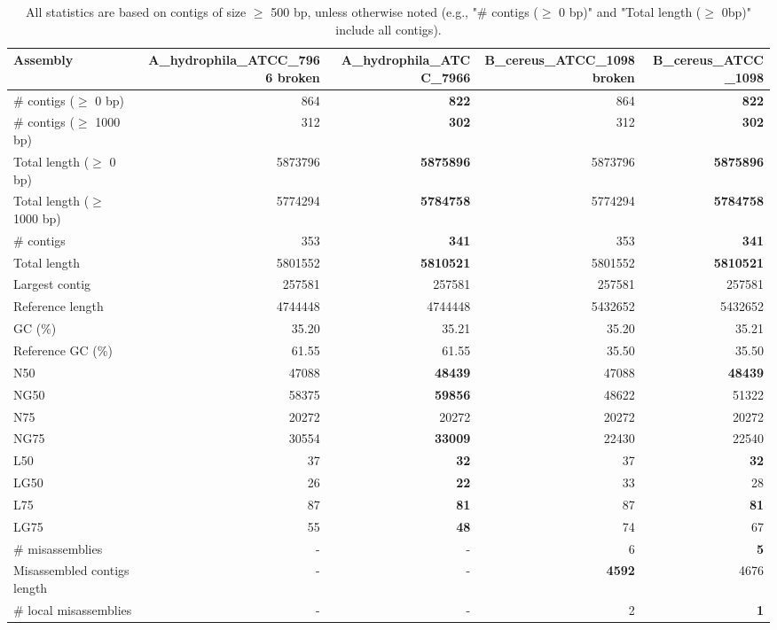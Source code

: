 \documentclass[12pt,a4paper]{article}
\begin{document}
\begin{table}[ht]
\begin{center}
\caption{All statistics are based on contigs of size $\geq$ 500 bp, unless otherwise noted (e.g., "\# contigs ($\geq$ 0 bp)" and "Total length ($\geq$ 0bp)" include all contigs).}
\begin{tabular}{|l*{4}{|r}|}
\hline
Assembly & A\_hydrophila\_ATCC\_7966 broken & A\_hydrophila\_ATCC\_7966 & B\_cereus\_ATCC\_1098 broken & B\_cereus\_ATCC\_1098 \\ \hline
\# contigs ($\geq$ 0 bp) & 864 & {\bf 822} & 864 & {\bf 822} \\ \hline
\# contigs ($\geq$ 1000 bp) & 312 & {\bf 302} & 312 & {\bf 302} \\ \hline
Total length ($\geq$ 0 bp) & 5873796 & {\bf 5875896} & 5873796 & {\bf 5875896} \\ \hline
Total length ($\geq$ 1000 bp) & 5774294 & {\bf 5784758} & 5774294 & {\bf 5784758} \\ \hline
\# contigs & 353 & {\bf 341} & 353 & {\bf 341} \\ \hline
Total length & 5801552 & {\bf 5810521} & 5801552 & {\bf 5810521} \\ \hline
Largest contig & 257581 & 257581 & 257581 & 257581 \\ \hline
Reference length & 4744448 & 4744448 & 5432652 & 5432652 \\ \hline
GC (\%) & 35.20 & 35.21 & 35.20 & 35.21 \\ \hline
Reference GC (\%) & 61.55 & 61.55 & 35.50 & 35.50 \\ \hline
N50 & 47088 & {\bf 48439} & 47088 & {\bf 48439} \\ \hline
NG50 & 58375 & {\bf 59856} & 48622 & 51322 \\ \hline
N75 & 20272 & 20272 & 20272 & 20272 \\ \hline
NG75 & 30554 & {\bf 33009} & 22430 & 22540 \\ \hline
L50 & 37 & {\bf 32} & 37 & {\bf 32} \\ \hline
LG50 & 26 & {\bf 22} & 33 & 28 \\ \hline
L75 & 87 & {\bf 81} & 87 & {\bf 81} \\ \hline
LG75 & 55 & {\bf 48} & 74 & 67 \\ \hline
\# misassemblies & - & - & 6 & {\bf 5} \\ \hline
Misassembled contigs length & - & - & {\bf 4592} & 4676 \\ \hline
\# local misassemblies & - & - & 2 & {\bf 1} \\ \hline

\end{tabular}
\end{center}
\end{table}
\end{document}
